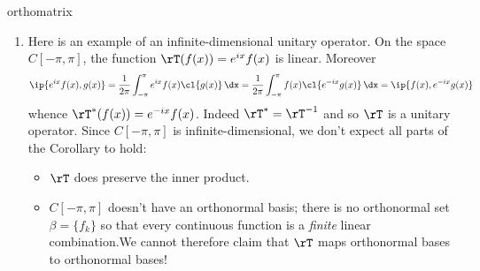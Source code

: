 \begin{examples}{}{orthomatrix}
\begin{enumerate}
\item\label{ex:infdimunitary} Here is an example of an infinite-dimensional unitary operator. On the space $C[-\pi,\pi]$, the function $\rT(f(x))=e^{ix}f(x)$ is linear. Moreover
\[\ip{e^{ix}f(x),g(x)}=\frac 1{2\pi}\int_{-\pi}^\pi e^{ix}f(x)\cl{g(x)}\,\dx =\frac 1{2\pi}\int_{-\pi}^\pi f(x)\cl{e^{-ix}g(x)}\,\dx =\ip{f(x),e^{-ix}g(x)}\]
whence $\rT^*(f(x))=e^{-ix}f(x)$. Indeed $\rT^*=\rT^{-1}$ and so $\rT$ is a unitary operator.\smallbreak
Since $C[-\pi,\pi]$ is infinite-dimensional, we don't expect all parts of the Corollary to hold:
\begin{itemize}
  \item[(a)] $\rT$ does preserve the inner product.
  \item[(b), (c)] $C[-\pi,\pi]$ doesn't have an orthonormal basis; there is no orthonormal set $\beta=\{f_k\}$ so that every continuous function is a \emph{finite} linear combination.\footnotemark We cannot therefore claim that $\rT$ maps orthonormal bases to orthonormal bases!
\end{itemize}
\end{enumerate}
\end{examples}


